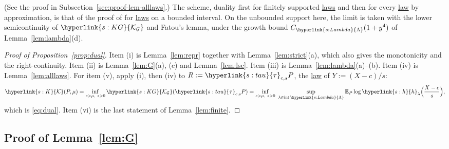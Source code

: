 \documentclass[11pt]{article}
\newcommand{\E}{\mathbb{E}}
\newcommand{\sy}[2]{{\hyperlink{#1}{#2}}}
\newcommand{\term}[2]{\hyperlink{#1}{#2}}
\newcommand{\Kc}{\sy{s:K}{\mathcal{K}}}
\newcommand{\KG}{\sy{s:KG}{\mathcal{K}_{\mathcal{G}}}}
\newcommand{\tauc}{\sy{s:tau}{\tau}}
\newcommand{\hl}{\sy{s:h}{h}}
\newcommand{\Lam}{\sy{s:Lambda}{\Lambda}}
\begin{document}
(See the proof in Subsection~\ref{sec:proof-lem-alllaws}.) The scheme, duality first for finitely supported
\term{w:law}{laws} and then for every \term{w:law}{law} by approximation, is that of the proof of
\citet[Theorem~8]{HT10} for \term{w:law}{laws} on a bounded interval. On the unbounded support here, the limit is taken
with the lower semicontinuity of $\KG$ and Fatou's lemma, under the growth bound $C_\Lam(1+y^4)$ of
Lemma~\ref{lem:lambda}(d).

\begin{proof}[Proof of Proposition~\ref{prop:dual}]
Item (i) is Lemma~\ref{lem:repr} together with Lemma~\ref{lem:strict}(a), which also gives the monotonicity and
the right-continuity. Item (ii) is Lemma~\ref{lem:G}(a), (c) and Lemma~\ref{lem:lsc}. Item (iii) is
Lemma~\ref{lem:lambda}(a)--(b). Item (iv) is Lemma~\ref{lem:alllaws}. For item (v), apply (i), then (iv) to
$R:=\tauc_{c,s}P$, the \term{w:law}{law} of $Y:=(X-c)/s$:
\begin{equation*}
  \Kc(P,\mu)=\inf_{c>\mu,\ s>0}\KG(\tauc_{c,s}P)=\inf_{c>\mu,\ s>0}\ \sup_{\lambda\in\mathrm{int}\,\Lam}\E_P\log\hl_\lambda\Bigl(\frac{X-c}{s}\Bigr),
\end{equation*}
which is \eqref{eq:dual}. Item (vi) is the last statement of Lemma~\ref{lem:finite}.
\end{proof}

\subsection{Proof of Lemma~\ref{lem:G}}\label{sec:proof-lem-G}
\end{document}
